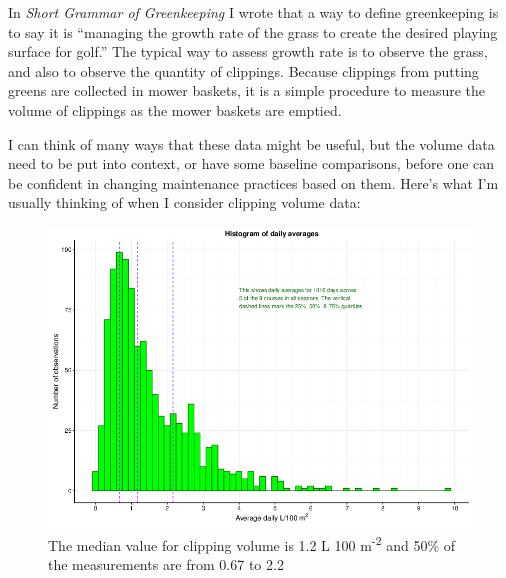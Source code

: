 \documentclass[12pt,b5,]{tufte-book}
\begin{document}
In \emph{Short Grammar of Greenkeeping} I wrote that a way to define
greenkeeping is to say it is ``managing the growth rate of the grass to
create the desired playing surface for golf.'' The typical way to assess
growth rate is to observe the grass, and also to observe the quantity of
clippings. Because clippings from putting greens are collected in mower
baskets, it is a simple procedure to measure the volume of clippings as
the mower baskets are emptied.

I can think of many ways that these data might be useful, but the volume
data need to be put into context, or have some baseline comparisons,
before one can be confident in changing maintenance practices based on
them. Here's what I'm usually thinking of when I consider clipping
volume data:

\begin{figure}
\centering
\includegraphics{figs/histDaily.png}
\caption{The median value for clipping volume is 1.2 L 100 m\textsuperscript{-2} and 50\% of the
measurements are from 0.67 to 2.2}
\end{figure}
\end{document}
